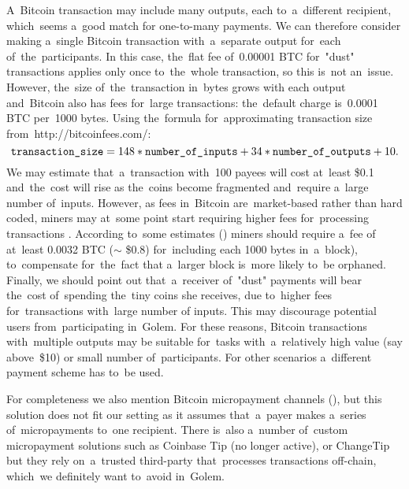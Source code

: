 \documentclass[a4paper]{article}
\newcommand{\BTC}{BTC}
\begin{document}
    A~Bitcoin transaction may include many outputs, each to~a~different recipient, which~seems a~good match for
    one-to-many payments. We can therefore consider making a~single Bitcoin transaction with~a~separate output
    for~each of~the~participants. In this case, the~flat fee of~0.00001 \BTC{} for~"dust" transactions applies only
    once to~the~whole transaction, so this  is~not an~issue. However, the~size of~the~transaction in~bytes grows with
    each output and~Bitcoin also has fees for~large transactions: the~default charge  is~0.0001 \BTC{} per~1000 bytes.
    Using the~formula for~approximating transaction size from~http://bitcoinfees.com/\cite{BITFEE}:
    \begin{displaymath}
	    \text{\texttt{transaction\_size}} = 148 * \text{\texttt{number\_of\_inputs}} +
	    34 * \text{\texttt{number\_of\_outputs}} + 10.
	\end{displaymath}
    We may estimate that~a~transaction with~100 payees will cost at~least \$0.1 and~the~cost will rise as the~coins
    become fragmented and~require a~large number of~inputs. However, as fees in~Bitcoin are~market-based rather than
    hard coded, miners may at~some point start requiring higher fees for~processing transactions \cite{KASKALOGLU}.
    According to~some estimates (\cite{ANDRESEN}) miners should require a~fee of
    at~least 0.0032 \BTC{} ($\sim$ \$0.8) for~including each 1000 bytes in~a~block), to~compensate for~the~fact that
    a~larger block  is~more likely to~be orphaned. Finally, we should point out that~a~receiver of~"dust" payments will
    bear the~cost of~spending the~tiny coins she receives, due to~higher fees for~transactions with~large number of
    inputs. This may discourage potential users from~participating in~Golem. For these reasons, Bitcoin transactions
    with~multiple outputs may be suitable for~tasks with~a~relatively high value (say above~\$10) or small number
    of~participants. For other scenarios a~different payment scheme has to~be used.

    For completeness we also mention Bitcoin micropayment channels (\cite{BITCOINJ}), but this solution does not fit
    our setting as it assumes that~a~payer makes a~series of~micropayments to~one recipient.
    There  is~also a~number of~custom micropayment solutions such as Coinbase Tip \cite{COINTIP}(no longer active),
    or ChangeTip \cite{CHANGETIP} but they rely on~a~trusted third-party that~processes transactions off-chain,
    which~we definitely want to~avoid in~Golem.
\end{document}
